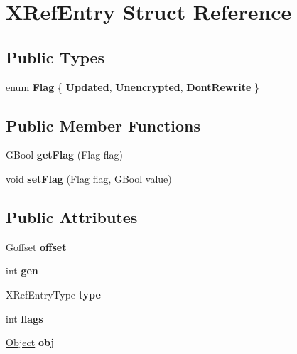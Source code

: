 \hypertarget{struct_x_ref_entry}{}\section{X\+Ref\+Entry Struct Reference}
\label{struct_x_ref_entry}
\subsection*{Public Types}
\begin{DoxyCompactItemize}
\item 
\mbox{\label{struct_x_ref_entry_a1854307a550776d7bf3eb455889a6151}} 
enum {\bfseries Flag} \{ {\bfseries Updated}, 
{\bfseries Unencrypted}, 
{\bfseries Dont\+Rewrite}
 \}
\end{DoxyCompactItemize}
\subsection*{Public Member Functions}
\begin{DoxyCompactItemize}
\item 
\mbox{\label{struct_x_ref_entry_a5b34d3ab73c1f79a437519e1f5a8270c}} 
G\+Bool {\bfseries get\+Flag} (Flag flag)
\item 
\mbox{\label{struct_x_ref_entry_a9a6fe6f2c4a132e3f96f0966d7838e10}} 
void {\bfseries set\+Flag} (Flag flag, G\+Bool value)
\end{DoxyCompactItemize}
\subsection*{Public Attributes}
\begin{DoxyCompactItemize}
\item 
\mbox{\label{struct_x_ref_entry_a322a8b9152007330abba4d7ff194a7ac}} 
Goffset {\bfseries offset}
\item 
\mbox{\label{struct_x_ref_entry_aa7d39d7bc330fd88a3128d1d20e15e73}} 
int {\bfseries gen}
\item 
\mbox{\label{struct_x_ref_entry_ad1c6ad4daa7768a6fafde3c1a10a6adc}} 
X\+Ref\+Entry\+Type {\bfseries type}
\item 
\mbox{\label{struct_x_ref_entry_a5fd0f2f8427181abb1fb6a65d31b71dc}} 
int {\bfseries flags}
\item 
\mbox{\label{struct_x_ref_entry_acf24be5b1788aae8b36b8f9c7bd34fb1}} 
\hyperlink{class_object}{Object} {\bfseries obj}
\end{DoxyCompactItemize}


